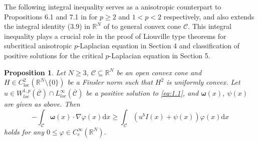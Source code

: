 \documentclass[12pt]{amsart}
\newtheorem{prop}[thm]{Proposition}
\theoremstyle{definition}
\theoremstyle{remark}
\theoremstyle{conclusion}
\theoremstyle{conjecture}
\numberwithin{equation}{section}
\begin{document}
The following integral inequality serves as a anisotropic counterpart to Propositions 6.1 and 7.1 in \cite{SZ} for $p\geq2$ and $1<p<2$ respectively, and also extends the integral identity (3.9) in $\mathbb{R}^N$ of \cite{CHN} to general convex cone $\mathcal{C}$. This integral inequality plays a crucial role in the proof of Liouville type theorems for subcritical anisotropic $p$-Laplacian equation in Section 4 and classification of positive solutions for the critical $p$-Laplacian equation in Section 5.
\begin{prop}\label{inte ineq}
Let $N\geq3$, $\mathcal{C}\subseteq\mathbb{R}^{N}$ be an open convex cone and $H\in C^{2}_{\text{loc}}(\mathbb{R}^{N}\setminus\{0\})$ be a Finsler norm such that $H^{2}$ is uniformly convex. Let $u\in  W^{1,p}_{loc}(\overline{\mathcal{C}})\cap L^{\infty}_{loc}(\overline{\mathcal{C}})$ be a positive solution to \eqref{eq:1.1}, and $\bm{\omega}(x)$, $\psi(x)$ are given as above. Then
\begin{equation}\label{key}
 - \int_{\mathcal{C}}\bm{\omega}(x)\cdot\nabla\varphi(x)\mathrm{d}x\geq\int_{\mathcal{C}}(u^bI(x)+\psi(x))\varphi(x)\mathrm{d}x
\end{equation}
holds for any $0\leq\varphi\in C^{\infty}_c(\mathbb{R}^N)$.
\end{prop}
\end{document}
